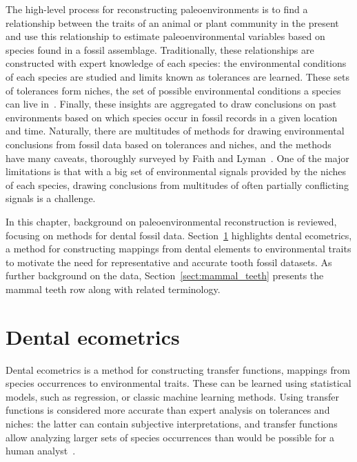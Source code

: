 \documentclass[english,twoside,openright]{UH_DS_MSc}
\begin{document}
The high-level process for reconstructing paleoenvironments is to find a relationship between the traits of an animal or plant community in the present and use this 
relationship to estimate paleoenvironmental variables based on species found in a fossil assemblage.
Traditionally, these relationships are constructed with expert knowledge of each species: the environmental conditions of
each species are studied and limits known as tolerances are learned. These sets of tolerances form niches,
the set of possible environmental conditions a species can live in~\cite{Faith_Lyman_2019_ch2}. Finally, these insights are aggregated to 
draw conclusions on past environments based on which species occur in fossil records in a given location and time.
Naturally, there are multitudes of methods for drawing environmental conclusions from fossil data based on 
tolerances and niches, and the methods have many caveats, thoroughly surveyed by Faith and Lyman~\cite{Faith_Lyman_2019}. One of the major limitations is that with a big set of environmental signals provided by the niches of each species, drawing conclusions from multitudes of often partially conflicting signals is a challenge.

In this chapter, background on paleoenvironmental reconstruction is reviewed, focusing on methods for dental fossil data.
Section~\ref{sect:ecometrics} highlights dental ecometrics, a method for constructing mappings from dental elements to environmental traits to motivate the 
need for representative and accurate tooth fossil datasets. As further background on the data, Section~\ref{sect:mammal_teeth} presents the mammal teeth 
row along with related terminology.

\section{Dental ecometrics}
\label{sect:ecometrics}

Dental ecometrics is a method for constructing transfer functions, mappings from species occurrences to environmental traits.
These can be learned using statistical models, such as regression, or classic machine learning methods.
Using transfer functions is considered more accurate than expert analysis on tolerances and niches: the latter
can contain subjective interpretations, and transfer functions allow analyzing larger sets of species occurrences than would 
 be possible for a human analyst~\cite{Faith_Lyman_2019_ch9}.
\end{document}
